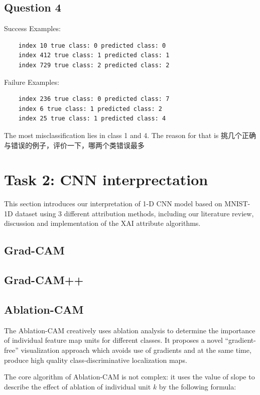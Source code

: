 \documentclass[conference]{IEEEtran}
\begin{document}
\subsection{Question 4}
Success Examples:
\begin{lstlisting}
    index 10 true class: 0 predicted class: 0
    index 412 true class: 1 predicted class: 1
    index 729 true class: 2 predicted class: 2
    \end{lstlisting}
Failure Examples:
\begin{lstlisting}
    index 236 true class: 0 predicted class: 7
    index 6 true class: 1 predicted class: 2
    index 25 true class: 1 predicted class: 4
\end{lstlisting}
The most misclassification lies in class 1 and 4.
The reason for that is
挑几个正确与错误的例子，评价一下，哪两个类错误最多
\section{Task 2: CNN interprectation}


This section introduces our interpretation of 1-D CNN model based on MNIST-1D dataset using 3 different attribution methods, including our literature review, discussion and implementation of the XAI attribute algorithms.

\subsection{Grad-CAM}

\subsection{Grad-CAM++}

\subsection{Ablation-CAM}

The Ablation-CAM creatively uses ablation analysis to determine the importance of individual feature map units for different classes. It proposes a novel “gradient-free” visualization approach which avoids use of gradients and at the same time, produce high quality class-discriminative localization maps.\par

The core algorithm of Ablation-CAM is not complex: it uses the value of slope to describe the effect of ablation of individual unit $k$ by the following formula:
\end{document}
